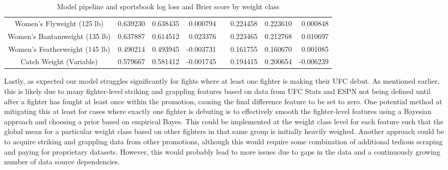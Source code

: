 \documentclass[12pt,twoside]{report}
\begin{document}
\begin{table}[!htb]
\begin{tabular}{@{}cccrlccr@{}}
Women's Flyweight (125 lb)     & 0.639230 & 0.638435 & 0.000794                     &                                       & 0.224458 & 0.223610 & 0.000848                     \\
Women's Bantamweight (135 lb)  & 0.637887 & 0.614512 & 0.023376                     &                                       & 0.223465 & 0.212768 & 0.010697                     \\
Women's Featherweight (145 lb) & 0.490214 & 0.493945 & -0.003731                    &                                       & 0.161755 & 0.160670 & 0.001085                     \\
Catch Weight (Variable)        & 0.579667 & 0.581412 & -0.001745                    & \multicolumn{1}{c}{}                  & 0.194415 & 0.200654 & -0.006239                    \\ \bottomrule
\end{tabular}
\caption{Model pipeline and sportsbook log loss and Brier score by weight class}
\end{table}
\normalsize

Lastly, as expected our model struggles significantly for fights where at least one fighter is making their UFC debut. As mentioned earlier, this is likely due to many fighter-level striking and grappling features based on data from UFC Stats and ESPN not being defined until after a fighter has fought at least once within the promotion, causing the final difference feature to be set to zero. One potential method at mitigating this at least for cases where exactly one fighter is debuting is to effectively smooth the fighter-level features using a Bayesian approach and choosing a prior based on empirical Bayes. This could be implemented at the weight class level for each feature such that the global mean for a particular weight class based on other fighters in that same group is initially heavily weighed. Another approach could be to acquire striking and grappling data from other promotions, although this would require some combination of additional tedious scraping and paying for proprietary datasets. However, this would probably lead to more issues due to gaps in the data and a continuously growing number of data source dependencies.
\end{document}
